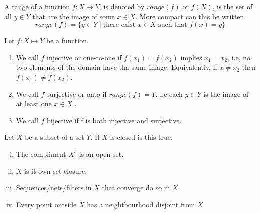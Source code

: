 \documentclass{article}
\theoremstyle{remark}
\begin{document}
\begin{definition}[Range]
  A range of a function $f: X \mapsto Y$, is denoted by $range\left( f \right) $ or $f\left( X \right) $, is the set of all $y \in Y$ that are the image of some $x \in X$. More compact can this be written. \[
    range\left( f \right) = \{y \in Y  \mid \text{there exist } x \in X \text{ such that } f\left( x \right) = y\} 
  \] 
\end{definition}

\begin{definition}
  Let $f: X \mapsto Y$ be a function. 
  \begin{enumerate}
    \item We call $f$ injective or one-to-one if $f\left( x_1 \right)  = f\left( x_2 \right) $ implies $x_1=x_2$, i.e, no two elements of the domain have tha same image. Equivalently, if $x \neq x_2$ then $f\left( x_1 \right) \neq f\left( x_2 \right) $. 
    \item We call $f$ surjective or onto if $range\left( f \right) = Y$, i.e each $y \in Y$ is the image of at least one $x \in X$ .
    \item We call $f$ bijective if f is both injective and surjective.
  \end{enumerate}
\end{definition}

\begin{definition}

  Let $X$ be a subset of a set $Y$.
  If $X$ is closed is this true.
  \begin{enumerate}[(i)]
    \item The compliment $X^{c}$ is an open set.
    \item $X$ is it own set closure.
    \item Sequences/nets/filters in $X$ that converge do so in $X$.
    \item Every point outside  $X$ has a neightbourhood disjoint from $X$
  \end{enumerate}

\end{definition}




\end{document}
